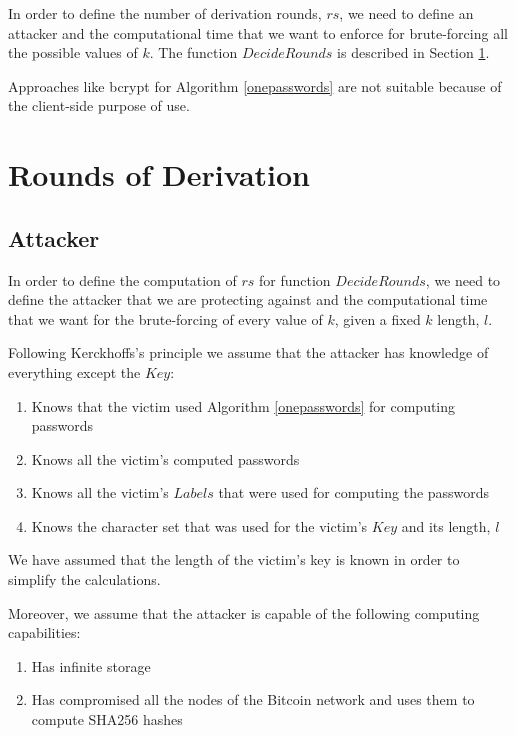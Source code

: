 \documentclass{sig-alternate}
\begin{document}
In order to define the number of derivation rounds, $rs$, we need to define an attacker
and the computational time that we want to enforce for brute-forcing all
the possible values of $k$. The function $DecideRounds$ is described in Section \ref{section:calculations}.

Approaches like bcrypt \cite{provos1999bcrypt} for Algorithm \ref{onepasswords} are
not suitable because of the client-side purpose of use.

\section{Rounds of Derivation}
\label{section:calculations}

\subsection{Attacker}
\label{section:calculations:attacker}

In order to define the computation of $rs$ for function $DecideRounds$, we need to
define the attacker that we are protecting against and the computational time that
we want for the brute-forcing of every value of $k$, given a fixed $k$ length, $l$.

Following Kerckhoffs's principle \cite{kerckhoffs1978cryptographie} we assume that
the attacker has knowledge of everything except the $Key$:

\begin{enumerate}
  \item Knows that the victim used Algorithm \ref{onepasswords} for computing passwords
  \item Knows all the victim's computed passwords
  \item Knows all the victim's $Labels$ that were used for computing the passwords
  \item Knows the character set that was used for the victim's $Key$ and its length, $l$
\end{enumerate}

We have assumed that the length of the victim's key is known in order to simplify the calculations. 

Moreover, we assume that the attacker is capable of the following computing capabilities:

\begin{enumerate}
\item Has infinite storage
\item Has compromised all the nodes of the Bitcoin \cite{nakamoto2008bitcoin} network and uses them to compute SHA256 hashes
\end{enumerate}
\end{document}
